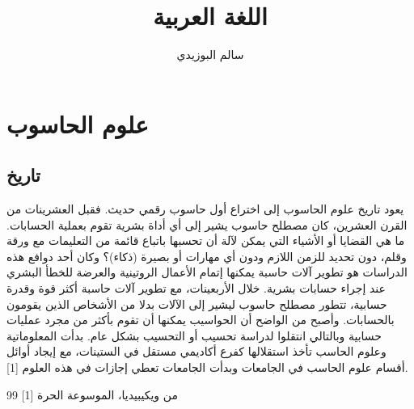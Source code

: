 \documentclass[11pt,a4paper]{report}
\title{
    \Huge\textsc{اللغة العربية}
}
\author{سالم البوزيدي}
\begin{document}
\maketitle
\tableofcontents
\chapter{علوم الحاسوب}
\section{تاريخ}
\begin{otherlanguage}{arabic}
يعود تاريخ علوم الحاسوب إلى اختراع أول حاسوب رقمي حديث. فقبل العشرينات من القرن العشرين، كان مصطلح حاسوب  يشير إلى أي أداة بشرية تقوم بعملية الحسابات. ما هي القضايا أو الأشياء التي يمكن لآلة أن تحسبها باتباع قائمة من التعليمات مع ورقة وقلم، دون تحديد للزمن اللازم ودون أي مهارات أو بصيرة (ذكاء)؟ وكان أحد دوافع هذه الدراسات هو تطوير آلات حاسبة  يمكنها إتمام الأعمال الروتينية والعرضة للخطأ البشري عند إجراء حسابات بشرية.
خلال الأربعينات، مع تطوير آلات حاسبة أكثر قوة وقدرة حسابية، تتطور مصطلح حاسوب ليشير إلى الآلات بدلا من الأشخاص الذين يقومون بالحسابات. وأصبح من الواضح أن الحواسيب يمكنها أن تقوم بأكثر من مجرد عمليات حسابية وبالتالي انتقلوا لدراسة تحسيب أو التحسيب بشكل عام. بدأت المعلوماتية وعلوم الحاسب تأخذ استقلالها كفرع أكاديمي مستقل في الستينات، مع إيجاد أوائل أقسام علوم الحاسب في الجامعات وبدأت الجامعات تعطي إجازات في هذه العلوم [1]. 
\end{otherlanguage}
\begin{thebibliography}{99}
   [1]
       من ويكيبيديا، الموسوعة الحرة
       \end{thebibliography}
       
\end{document}
